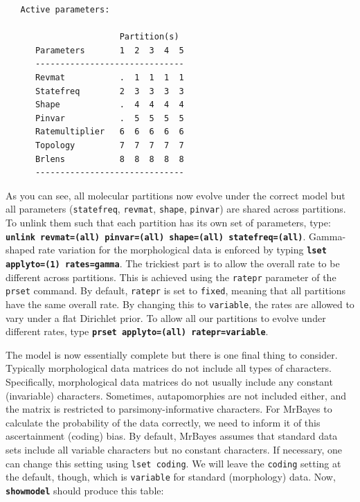 \documentclass[12pt]{book}
\newcommand{\ttt}[1]{\texttt{#1}}
\newcommand{\tb}[1]{\ttt{\textbf{#1}}}
\begin{document}
\begin{singlespacing}
\footnotesize
\begin{verbatim}
   Active parameters:
 
                       Partition(s)
      Parameters       1  2  3  4  5
      ------------------------------
      Revmat           .  1  1  1  1
      Statefreq        2  3  3  3  3
      Shape            .  4  4  4  4
      Pinvar           .  5  5  5  5
      Ratemultiplier   6  6  6  6  6
      Topology         7  7  7  7  7
      Brlens           8  8  8  8  8
      ------------------------------
\end{verbatim}
\normalsize
\end{singlespacing}

As you can see, all molecular partitions now evolve under the correct model but all parameters
(\ttt{statefreq}, \ttt{revmat}, \ttt{shape}, \ttt{pinvar}) are shared across partitions. To unlink
them such that each partition has its own set of parameters, type: \tb{unlink revmat=(all)
pinvar=(all) shape=(all) statefreq=(all)}. Gamma-shaped rate variation for the morphological data
is enforced by typing \tb{lset applyto=(1) rates=gamma}. The trickiest part is to allow the overall
rate to be different across partitions. This is achieved using the \ttt{ratepr} parameter of the
\ttt{prset} command. By default, \ttt{ratepr} is set to \ttt{fixed}, meaning that all partitions
have the same overall rate. By changing this to \ttt{variable}, the rates are allowed to vary under
a flat Dirichlet prior. To allow all our partitions to evolve under different rates, type \tb{prset
applyto=(all) ratepr=variable}.

The model is now essentially complete but there is one final thing to consider. Typically
morphological data matrices do not include all types of characters. Specifically, morphological
data matrices do not usually include any constant (invariable) characters. Sometimes,
autapomorphies are not included either, and the matrix is restricted to parsimony-informative
characters. For MrBayes to calculate the probability of the data correctly, we need to inform it of
this ascertainment (coding) bias. By default, MrBayes assumes that standard data sets include all
variable characters but no constant characters. If necessary, one can change this setting using
\ttt{lset coding}. We will leave the \ttt{coding} setting at the default, though, which is
\ttt{variable} for standard (morphology) data. Now, \tb{showmodel} should produce this table:
\end{document}
